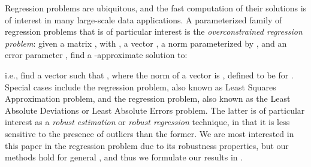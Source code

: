 \documentclass[11pt]{article}
\begin{document}
Regression problems are ubiquitous, and the fast computation of their 
solutions is of interest in many large-scale data applications.
A parameterized family of regression problems that is of particular interest 
is the \emph{overconstrained  regression problem}: given a matrix 
, with , a vector , a norm 
 parameterized by , and an error parameter 
, find a -approximate solution 
 to:

i.e., find a vector  such that 
, where the  norm of a
vector  is , defined to be
 for .
Special cases include the  regression problem, also known as Least
Squares Approximation problem, and the  regression problem, also known
as the Least Absolute Deviations or Least Absolute Errors problem.
The latter is of particular interest as a \emph{robust estimation} or
\emph{robust regression} technique, in that it is less sensitive to the presence
of outliers than the former.
We are most interested in this paper in the  regression problem due 
to its robustness properties, but our methods hold for general , 
and thus we formulate our results in .
\end{document}

